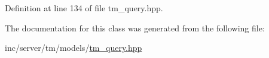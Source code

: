Definition at line 134 of file tm\+\_\+query.\+hpp.



The documentation for this class was generated from the following file\+:\begin{DoxyCompactItemize}
\item 
inc/server/tm/models/\hyperlink{tm__query_8hpp}{tm\+\_\+query.\+hpp}\end{DoxyCompactItemize}
